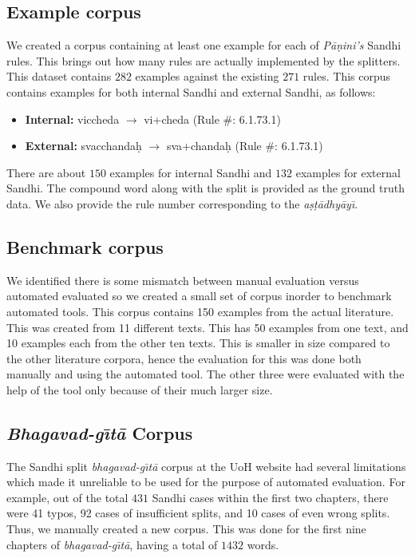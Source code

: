 \documentclass[11pt]{article}
\begin{document}
\subsection{Example corpus}
We created a corpus containing at least one example for each of \textit{P\={a}\d{n}ini's} Sandhi rules. This brings out how many rules are actually implemented by the splitters. This dataset contains $282$ examples against the existing $271$ rules. This corpus contains examples for both internal Sandhi and external Sandhi, as follows:
\begin{itemize}
	\item \textbf{Internal:} viccheda $\rightarrow$ vi+cheda (Rule \#: 6.1.73.1)
	\item \textbf{External:} svacchanda\d{h}	$\rightarrow$ sva+chanda\d{h} (Rule \#: 6.1.73.1)
\end{itemize}

There are about $150$ examples for internal Sandhi and $132$ examples for external Sandhi. The compound word along with the split is provided as the ground truth data. We also provide the rule number corresponding to the  \textit{a\d{s}\d{t}\={a}dhy\={a}y\={\i}}. 


\subsection{Benchmark corpus}
We identified there is some mismatch between manual evaluation versus automated evaluated so we created a small set of corpus inorder to benchmark automated tools.
This corpus contains 150 examples from the actual literature.  This was created from 11 different texts. This has 50 examples from one text, and 10 examples each from the other ten texts. This is smaller in size compared to the other literature corpora, hence the evaluation for this was done both manually and using the automated tool. The other three were evaluated with the help of the tool only because of their much larger size.

\subsection{\textit{Bhagavad-g\={\i}t\={a}} Corpus}
The Sandhi split \textit{bhagavad-g\={\i}t\={a}} corpus at the UoH website had several limitations which made it unreliable to be used for the purpose of automated evaluation. For example, out of the total $431$ Sandhi cases within the first two chapters, there were 41 typos, 92 cases of insufficient splits, and 10 cases of even wrong splits. Thus, we manually created a new corpus. This was done for the first nine chapters of \textit{bhagavad-g\={\i}t\={a}}, having a total of $1432$ words.
\end{document}
